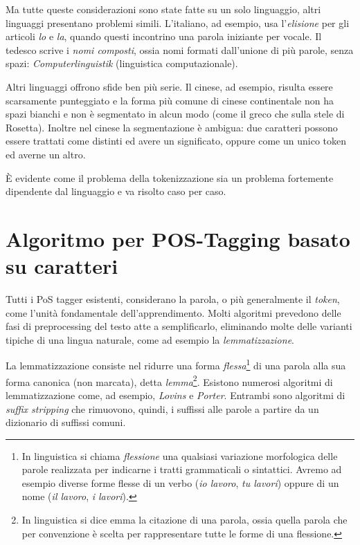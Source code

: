 Ma tutte queste considerazioni sono state fatte su un solo linguaggio, altri
linguaggi presentano problemi simili. L'italiano, ad esempio, usa l'\emph{elisione}
per gli articoli \emph{lo} e \emph{la}, quando questi incontrino una parola
iniziante per vocale. Il tedesco scrive i \emph{nomi composti}, ossia nomi formati
dall'unione di pi\`u parole, senza spazi: \emph{Computerlinguistik} (linguistica
computazionale).

Altri linguaggi offrono sfide ben pi\`u serie. Il cinese, ad esempio, risulta
essere scarsamente punteggiato e la forma pi\`u comune di cinese continentale
non ha spazi bianchi e non \`e segmentato in alcun modo (come il greco che sulla
stele di Rosetta). Inoltre nel cinese la segmentazione \`e ambigua: due caratteri
possono essere trattati come distinti ed avere un significato, oppure come un unico
token ed averne un altro.

\`E evidente come il problema della tokenizzazione sia un problema fortemente
dipendente dal linguaggio e va risolto caso per caso.

\section{Algoritmo per POS-Tagging basato su caratteri}

Tutti i PoS tagger esistenti, considerano la parola, o pi\`u generalmente il
\emph{token}, come l'unit\`a fondamentale dell'apprendimento. Molti algoritmi
prevedono delle fasi di preprocessing del testo atte a semplificarlo, eliminando
molte delle varianti tipiche di una lingua naturale, come ad esempio la \emph{lemmatizzazione}.

La lemmatizzazione consiste nel ridurre una forma \emph{flessa}\footnote{In
linguistica si chiama \emph{flessione} una qualsiasi variazione morfologica delle
parole realizzata per indicarne i tratti grammaticali o sintattici. Avremo ad
esempio diverse forme flesse di un verbo (\emph{io lavoro}, \emph{tu lavori})
oppure di un nome (\emph{il lavoro}, \emph{i lavori}).} di una parola alla sua
forma canonica (non marcata), detta \emph{lemma}\footnote{In linguistica si dice
emma la citazione di una parola, ossia quella parola che per convenzione è scelta
per rappresentare tutte le forme di una flessione.}. Esistono numerosi algoritmi
di lemmatizzazione come, ad esempio, \emph{Lovins} e \emph{Porter}. Entrambi sono
algoritmi di \emph{suffix stripping} che rimuovono, quindi, i suffissi alle
parole a partire da un dizionario di suffissi comuni.

